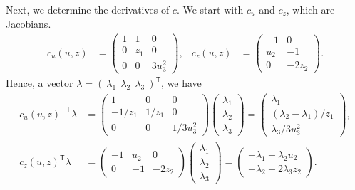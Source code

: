 \documentclass{article}
\newcommand{\trp}{^{\mathsf{T}}}
\newcommand{\invtrp}{^{-\mathsf{T}}}
\begin{document}
Next, we determine the derivatives of $c$.
We start with $c_u$ and $c_z$, which are Jacobians.
\begin{align*}
    c_{u}(u, z)
    &= \left(\begin{array}{ccc}
        1 & 1 & 0 \\
        0 & z_{1} & 0 \\
        0 & 0 & 3u_{3}^{2}
    \end{array}\right),
    &
    c_{z}(u, z)
    &= \left(\begin{array}{cc}
        -1 & 0 \\
        u_{2} & -1 \\
        0 & -2z_{2}
    \end{array}\right).
\end{align*}
Hence, a vector $\lambda = (~\lambda_{1}~~\lambda_{2}~~\lambda_{3}~)\trp$, we have
\begin{align*}
    c_{u}(u, z)\invtrp \lambda
    &= \left(\begin{array}{ccc}
        1 & 0 & 0 \\
        -1/z_{1} & 1/z_{1} & 0 \\
        0 & 0 & 1/3u_{3}^{2}
    \end{array}\right)
    \left(\begin{array}{c}
        \lambda_{1} \\ \lambda_{2} \\ \lambda_{3}
    \end{array}\right)
    = \left(\begin{array}{c}
        \lambda_{1} \\ (\lambda_{2} - \lambda_{1})/z_{1} \\ \lambda_{3}/3u_{3}^{2}
    \end{array}\right),
    \\
    c_{z}(u, z)\trp \lambda
    &= \left(\begin{array}{ccc}
        -1 & u_{2} & 0 \\
        0 & -1 & -2z_{2}
    \end{array}\right)
    \left(\begin{array}{c}
        \lambda_{1} \\ \lambda_{2} \\ \lambda_{3}
    \end{array}\right)
    = \left(\begin{array}{c}
        -\lambda_{1} + \lambda_{2}u_{2}
        \\
        -\lambda_{2} - 2\lambda_{3}z_{2}
    \end{array}\right).
\end{align*}
\end{document}
